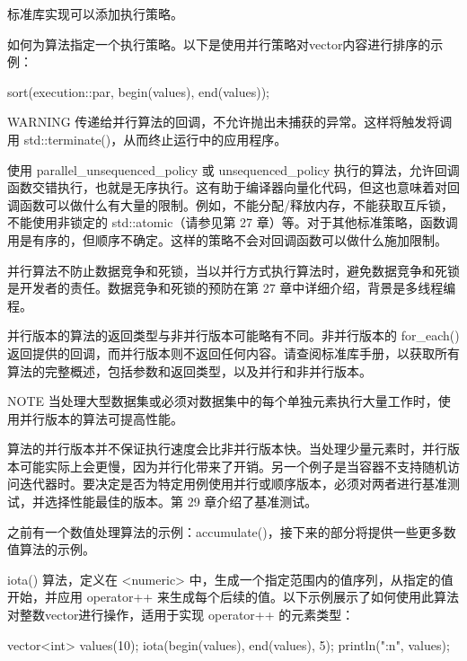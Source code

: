 标准库实现可以添加执行策略。

如何为算法指定一个执行策略。以下是使用并行策略对vector内容进行排序的示例：

\begin{cpp}
sort(execution::par, begin(values), end(values));
\end{cpp}

\begin{myWarning}{WARNING}
传递给并行算法的回调，不允许抛出未捕获的异常。这样将触发将调用 std::terminate()，从而终止运行中的应用程序。
\end{myWarning}

使用 parallel\_unsequenced\_policy 或 unsequenced\_policy 执行的算法，允许回调函数交错执行，也就是无序执行。这有助于编译器向量化代码，但这也意味着对回调函数可以做什么有大量的限制。例如，不能分配/释放内存，不能获取互斥锁，不能使用非锁定的 std::atomic（请参见第 27 章）等。对于其他标准策略，函数调用是有序的，但顺序不确定。这样的策略不会对回调函数可以做什么施加限制。

并行算法不防止数据竞争和死锁，当以并行方式执行算法时，避免数据竞争和死锁是开发者的责任。数据竞争和死锁的预防在第 27 章中详细介绍，背景是多线程编程。

并行版本的算法的返回类型与非并行版本可能略有不同。非并行版本的 for\_each() 返回提供的回调，而并行版本则不返回任何内容。请查阅标准库手册，以获取所有算法的完整概述，包括参数和返回类型，以及并行和非并行版本。

\begin{myNotic}{NOTE}
当处理大型数据集或必须对数据集中的每个单独元素执行大量工作时，使用并行版本的算法可提高性能。
\end{myNotic}

算法的并行版本并不保证执行速度会比非并行版本快。当处理少量元素时，并行版本可能实际上会更慢，因为并行化带来了开销。另一个例子是当容器不支持随机访问迭代器时。要决定是否为特定用例使用并行或顺序版本，必须对两者进行基准测试，并选择性能最佳的版本。第 29 章介绍了基准测试。


之前有一个数值处理算法的示例：accumulate()，接下来的部分将提供一些更多数值算法的示例。


iota() 算法，定义在 <numeric> 中，生成一个指定范围内的值序列，从指定的值开始，并应用 operator++ 来生成每个后续的值。以下示例展示了如何使用此算法对整数vector进行操作，适用于实现 operator++ 的元素类型：

\begin{cpp}
vector<int> values(10);
iota(begin(values), end(values), 5);
println("{:n}", values);
\end{cpp}

